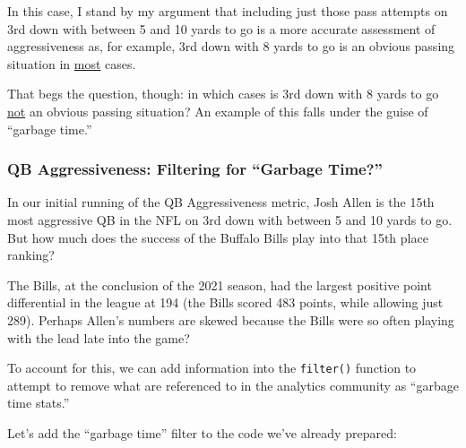 \documentclass[
  letterpaper,
]{krantz}
\begin{document}
In this case, I stand by my argument that including just those pass
attempts on 3rd down with between 5 and 10 yards to go is a more
accurate assessment of aggressiveness as, for example, 3rd down with 8
yards to go is an obvious passing situation in \uline{most} cases.

That begs the question, though: in which cases is 3rd down with 8 yards
to go \uline{not} an obvious passing situation? An example of this falls
under the guise of ``garbage time.''

\hypertarget{qb-aggressiveness-filtering-for-garbage-time}{%
\subsubsection{QB Aggressiveness: Filtering for ``Garbage
Time?''}\label{qb-aggressiveness-filtering-for-garbage-time}}

In our initial running of the QB Aggressiveness metric, Josh Allen is
the 15th most aggressive QB in the NFL on 3rd down with between 5 and 10
yards to go. But how much does the success of the Buffalo Bills play
into that 15th place ranking?

The Bills, at the conclusion of the 2021 season, had the largest
positive point differential in the league at 194 (the Bills scored 483
points, while allowing just 289). Perhaps Allen's numbers are skewed
because the Bills were so often playing with the lead late into the
game?

To account for this, we can add information into the \texttt{filter()}
function to attempt to remove what are referenced to in the analytics
community as ``garbage time stats.''

Let's add the ``garbage time'' filter to the code we've already
prepared:
\end{document}
